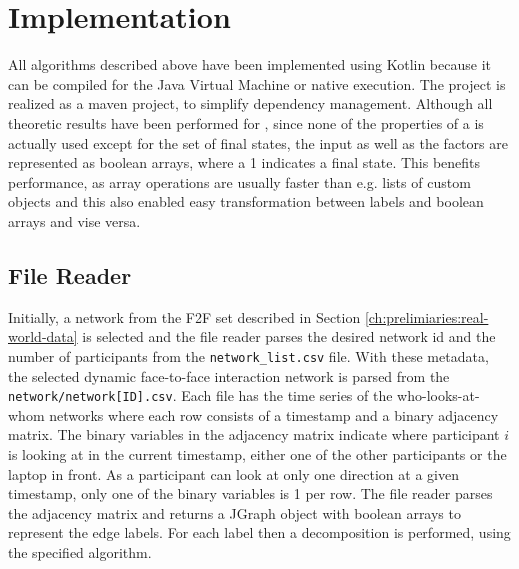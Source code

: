 \chapter{Implementation}
\label{ch:Implementation}
All algorithms described above have been implemented using Kotlin because it can be compiled for the Java Virtual Machine or native execution.
The project is realized as a maven project, to simplify dependency management.
Although all theoretic results have been performed for \DFAs, since none of the properties of a \DFA is actually used except for the set of final states, the input as well as the factors are represented as boolean arrays, where a 1 indicates a final state.
This benefits performance, as array operations are usually faster than e.g. lists of custom objects and this also enabled easy transformation between labels and boolean arrays and vise versa. 

\section{File Reader}
\label{ch:Implementation:file-reader}
Initially, a network from the F2F set described in Section \ref{ch:prelimiaries:real-world-data} is selected and the file reader parses the desired network id and the number of participants from the \verb*|network_list.csv| file.
With these metadata, the selected dynamic face-to-face interaction network is parsed from the \verb*|network/network[ID].csv|.
Each file has the time series of the who-looks-at-whom networks where each row consists of a timestamp and a binary adjacency matrix.
The binary variables in the adjacency matrix indicate where participant $i$ is looking at in the current timestamp, either one of the other participants or the laptop in front.
As a participant can look at only one direction at a given timestamp, only one of the binary variables is 1 per row.
The file reader parses the adjacency matrix and returns a JGraph object with boolean arrays to represent the edge labels.
For each label then a decomposition is performed, using the specified algorithm.

